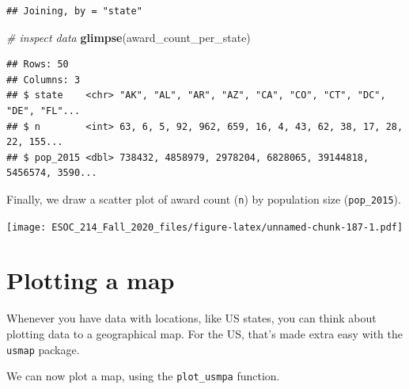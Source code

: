 \documentclass[
]{book}
\newenvironment{Shaded}{\begin{snugshade}}{\end{snugshade}}
\newcommand{\CommentTok}[1]{\textcolor[rgb]{0.56,0.35,0.01}{\textit{#1}}}
\newcommand{\DataTypeTok}[1]{\textcolor[rgb]{0.13,0.29,0.53}{#1}}
\newcommand{\DecValTok}[1]{\textcolor[rgb]{0.00,0.00,0.81}{#1}}
\newcommand{\KeywordTok}[1]{\textcolor[rgb]{0.13,0.29,0.53}{\textbf{#1}}}
\newcommand{\NormalTok}[1]{#1}
\newcommand{\OperatorTok}[1]{\textcolor[rgb]{0.81,0.36,0.00}{\textbf{#1}}}
\newcommand{\StringTok}[1]{\textcolor[rgb]{0.31,0.60,0.02}{#1}}
\begin{document}
\begin{verbatim}
## Joining, by = "state"
\end{verbatim}

\begin{Shaded}
\begin{Highlighting}[]
\CommentTok{# inspect data}
\KeywordTok{glimpse}\NormalTok{(award_count_per_state)}
\end{Highlighting}
\end{Shaded}

\begin{verbatim}
## Rows: 50
## Columns: 3
## $ state    <chr> "AK", "AL", "AR", "AZ", "CA", "CO", "CT", "DC", "DE", "FL"...
## $ n        <int> 63, 6, 5, 92, 962, 659, 16, 4, 43, 62, 38, 17, 28, 22, 155...
## $ pop_2015 <dbl> 738432, 4858979, 2978204, 6828065, 39144818, 5456574, 3590...
\end{verbatim}

Finally, we draw a scatter plot of award count (\texttt{n}) by population size (\texttt{pop\_2015}).

\begin{Shaded}
\end{Shaded}

\texttt{[image: ESOC\_214\_Fall\_2020\_files/figure-latex/unnamed-chunk-187-1.pdf]}

\hypertarget{plotting-a-map}{%
\section{Plotting a map}\label{plotting-a-map}}

Whenever you have data with locations, like US states, you can think about plotting data to a geographical map. For the US, that's made extra easy with the \texttt{usmap} package.

We can now plot a map, using the \texttt{plot\_usmpa} function.

\begin{Shaded}
\end{Shaded}
\end{document}
